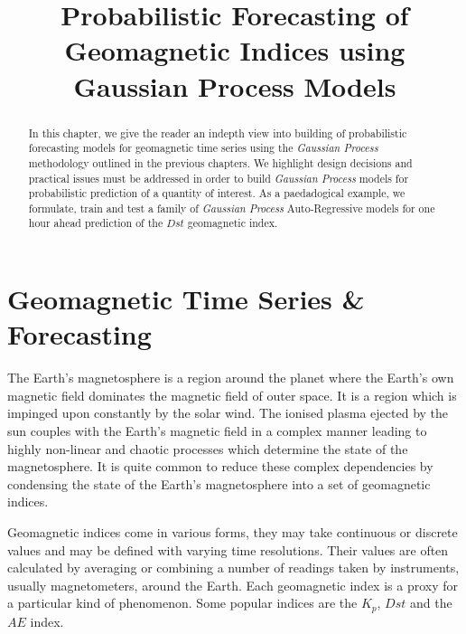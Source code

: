 \documentclass{article}
\title{Probabilistic Forecasting of Geomagnetic Indices using Gaussian Process Models}
\begin{document}
\begin{abstract}

In this chapter, we give the reader an indepth view into building of probabilistic forecasting models for geomagnetic time series using the \emph{Gaussian Process} methodology outlined in the previous chapters. We highlight design decisions and practical issues must be addressed in order to build \emph{Gaussian Process} models for probabilistic prediction of a quantity of interest. As a paedadogical example, we formulate, train and test a family of \emph{Gaussian Process} Auto-Regressive models for one hour ahead prediction of the $Dst$ geomagnetic index.  

\end{abstract}

\section{Geomagnetic Time Series \& Forecasting}

The Earth's magnetosphere is a region around the planet where the Earth's own magnetic field dominates the magnetic field of outer space. It is a region which is impinged upon constantly by the solar wind. The ionised plasma ejected by the sun couples with the Earth's magnetic field in a complex manner leading to highly non-linear and chaotic processes which determine the state of the magnetosphere. It is quite common to reduce these complex dependencies by condensing the state of the Earth's magnetosphere into a set of geomagnetic indices.

Geomagnetic indices come in various forms, they may take continuous or discrete values and may be defined with varying time resolutions. Their values are often calculated by averaging or combining a number of readings taken by instruments, usually magnetometers, around the Earth. Each geomagnetic index is a proxy for a particular kind of phenomenon. Some popular indices are the $K_p$, $Dst$ and the $AE$ index.
\end{document}
